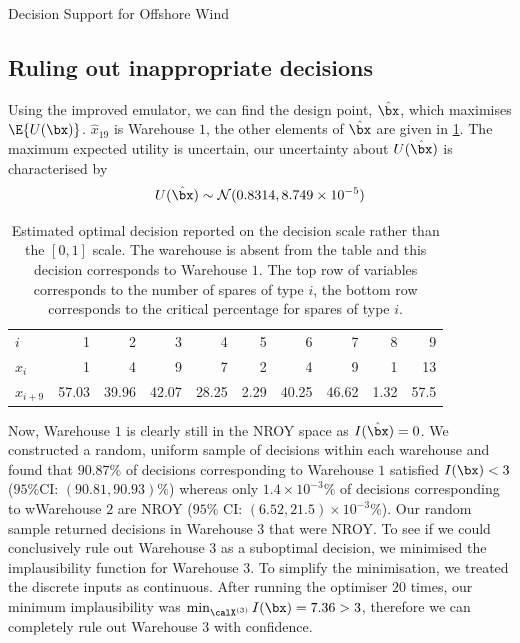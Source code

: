 \begin{chapter}{Decision Support for Offshore Wind \label{Ch:ds-for-ow}}
\subsection{Ruling out inappropriate decisions}
Using the improved emulator, we can find the design point, $\hat{\bx}$, which maximises $\E\{U(\bx)\}$. $\hat{x}_{19}$ is Warehouse $1$, the other elements of $\hat{\bx}$ are given in \cref{Tab:optimiser}. The maximum expected utility is uncertain, our uncertainty about $U(\hat{\bx})$ is characterised by \begin{equation}
  U(\hat{\bx}) \sim \mathcal{N} (0.8314, 8.749 \times 10^{-5})
\end{equation}
\begin{table}
  \centering
  \begin{tabular}{lrrrrrrrrr}
    \toprule
    $i$ &1&2&3&4&5&6&7&8&9\\\cmidrule{1-10}
    $\hat{x}_i$& 1 & 4 & 9 & 7 & 2 & 4 & 9 & 1 & 13\\
    $\hat{x}_{i+9}$ &57.03 & 39.96 & 42.07 & 28.25 & 2.29 & 40.25 & 46.62 & 1.32 & 57.5\\
    \bottomrule
  \end{tabular}
  \caption{Estimated optimal decision reported on the decision scale rather than the $[0,1]$ scale. The warehouse is absent from the table and this decision corresponds to Warehouse $1$. The top row of variables corresponds to the number of spares of type $i$, the bottom row corresponds to the critical percentage for spares of type $i$.}
  \label{Tab:optimiser}
\end{table}
Now, Warehouse $1$ is clearly still in the NROY space as $I(\hat{\bx}) = 0$. We constructed a random, uniform sample of decisions within each warehouse and found that $90.87\%$ of decisions corresponding to Warehouse $1$ satisfied $I(\bx)  < 3$ ($95\%$CI: $(90.81, 90.93)\%$) whereas only $1.4 \times 10^{-3}\%$ of decisions corresponding to wWarehouse $2$ are NROY ($95\%$ CI:   $(6.52, 21.5)\times 10^{-3}\%$). Our random sample returned decisions in Warehouse $3$ that were NROY. To see if we could conclusively rule out Warehouse $3$ as a suboptimal decision, we minimised the implausibility function for Warehouse $3$. To simplify the minimisation, we treated the discrete inputs as continuous. After running the optimiser $20$ times, our minimum implausibility was $\min_{\calX^{(3)}} I(\bx) = 7.36 >  3$, therefore we can completely rule out Warehouse $3$ with confidence.


\end{chapter}
